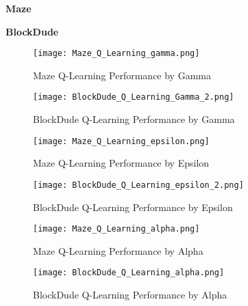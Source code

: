 \documentclass{article}
\begin{document}
\textbf{Maze}

\textbf{BlockDude}

\begin{figure}
    \centering
    \begin{minipage}{0.5\textwidth}
        \centering
        \texttt{[image: Maze\_Q\_Learning\_gamma.png]}
        \caption{Maze Q-Learning Performance by Gamma}
        \label{fig:maze-ql-gamma}
    \end{minipage}\hfill
    \begin{minipage}{0.5\textwidth}
        \centering
        \texttt{[image: BlockDude\_Q\_Learning\_Gamma\_2.png]}
        \caption{BlockDude Q-Learning Performance by Gamma}
        \label{fig:bd-ql-gamma}
    \end{minipage}
\end{figure}

\begin{figure}
    \centering
    \begin{minipage}{0.5\textwidth}
        \centering
        \texttt{[image: Maze\_Q\_Learning\_epsilon.png]}
        \caption{Maze Q-Learning Performance by Epsilon}
        \label{fig:maze-ql-epsilon}
    \end{minipage}\hfill
    \begin{minipage}{0.5\textwidth}
        \centering
        \texttt{[image: BlockDude\_Q\_Learning\_epsilon\_2.png]}
        \caption{BlockDude Q-Learning Performance by Epsilon}
        \label{fig:bd-ql-epsilon}
    \end{minipage}
\end{figure}

\begin{figure}
    \centering
    \begin{minipage}{0.5\textwidth}
        \centering
        \texttt{[image: Maze\_Q\_Learning\_alpha.png]}
        \caption{Maze Q-Learning Performance by Alpha}
        \label{fig:maze-ql-alpha}
    \end{minipage}\hfill
    \begin{minipage}{0.5\textwidth}
        \centering
        \texttt{[image: BlockDude\_Q\_Learning\_alpha.png]}
        \caption{BlockDude Q-Learning Performance by Alpha}
        \label{fig:bd-ql-alpha}
    \end{minipage}
\end{figure}
\end{document}
